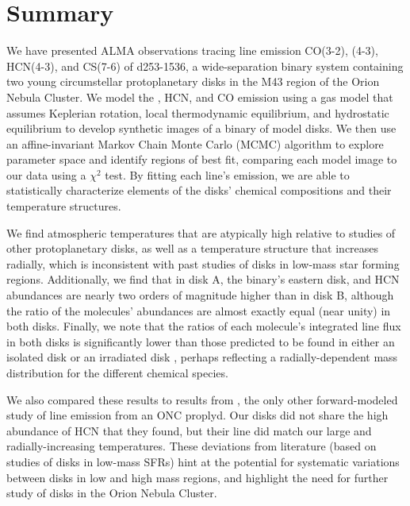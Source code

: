 \chapter{Summary}
\label{chap:Summary}


We have presented ALMA observations tracing line emission CO(3-2), \hco(4-3), HCN(4-3), and CS(7-6) of d253-1536, a wide-separation binary system containing two young circumstellar protoplanetary disks in the M43 region of the Orion Nebula Cluster. We model the \hco, HCN, and CO emission using a gas model that assumes Keplerian rotation, local thermodynamic equilibrium, and hydrostatic equilibrium to develop synthetic images of a binary of model disks. We then use an affine-invariant Markov Chain Monte Carlo (MCMC) algorithm to explore parameter space and identify regions of best fit, comparing each model image to our data using a $\chi^2$ test. By fitting each line's emission, we are able to statistically characterize elements of the disks' chemical compositions and their temperature structures.

We find atmospheric temperatures that are atypically high relative to studies of other protoplanetary disks, as well as a temperature structure that increases radially, which is inconsistent with past studies of disks in low-mass star forming regions. Additionally, we find that in disk A, the binary's eastern disk, \hco and HCN abundances are nearly two orders of magnitude higher than in disk B, although the ratio of the molecules' abundances are almost exactly equal (near unity) in both disks. Finally, we note that the ratios of each molecule's integrated line flux in both disks is significantly lower than those predicted to be found in either an isolated disk or an irradiated disk \citep{Walsh2013}, perhaps reflecting a radially-dependent mass distribution for the different chemical species.

We also compared these results to results from \citet{Factor2017}, the only other forward-modeled study of line emission from an ONC proplyd. Our disks did not share the high abundance of HCN that they found, but their \hco line did match our large and radially-increasing temperatures. These deviations from literature (based on studies of disks in low-mass SFRs) hint at the potential for systematic variations between disks in low and high mass regions, and highlight the need for further study of disks in the Orion Nebula Cluster.

